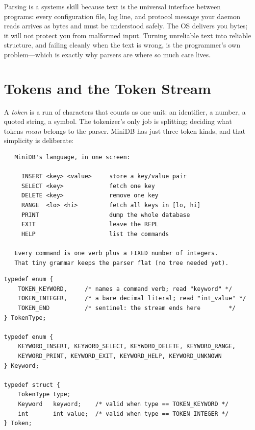 \begin{osconcept}
Parsing is a systems skill because text is the universal interface
between programs: every configuration file, log line, and protocol
message your daemon reads arrives as bytes and must be understood
safely. The OS delivers you bytes; it will not protect you from
malformed input. Turning unreliable text into reliable structure, and
failing cleanly when the text is wrong, is the programmer's own
problem---which is exactly why parsers are where so much care lives.
\end{osconcept}

\section{Tokens and the Token Stream}

A \emph{token} is a run of characters that counts as one unit: an
identifier, a number, a quoted string, a symbol. The tokenizer's only
job is splitting; deciding what tokens \emph{mean} belongs to the
parser. MiniDB has just three token kinds, and that simplicity is
deliberate:

\begin{verbatim}
   MiniDB's language, in one screen:

     INSERT <key> <value>     store a key/value pair
     SELECT <key>             fetch one key
     DELETE <key>             remove one key
     RANGE  <lo> <hi>         fetch all keys in [lo, hi]
     PRINT                    dump the whole database
     EXIT                     leave the REPL
     HELP                     list the commands

   Every command is one verb plus a FIXED number of integers.
   That tiny grammar keeps the parser flat (no tree needed yet).
\end{verbatim}

\begin{lstlisting}[caption={The token types and the token struct.}]
typedef enum {
    TOKEN_KEYWORD,     /* names a command verb; read "keyword" */
    TOKEN_INTEGER,     /* a bare decimal literal; read "int_value" */
    TOKEN_END          /* sentinel: the stream ends here        */
} TokenType;

typedef enum {
    KEYWORD_INSERT, KEYWORD_SELECT, KEYWORD_DELETE, KEYWORD_RANGE,
    KEYWORD_PRINT, KEYWORD_EXIT, KEYWORD_HELP, KEYWORD_UNKNOWN
} Keyword;

typedef struct {
    TokenType type;
    Keyword   keyword;    /* valid when type == TOKEN_KEYWORD */
    int       int_value;  /* valid when type == TOKEN_INTEGER */
} Token;
\end{lstlisting}

